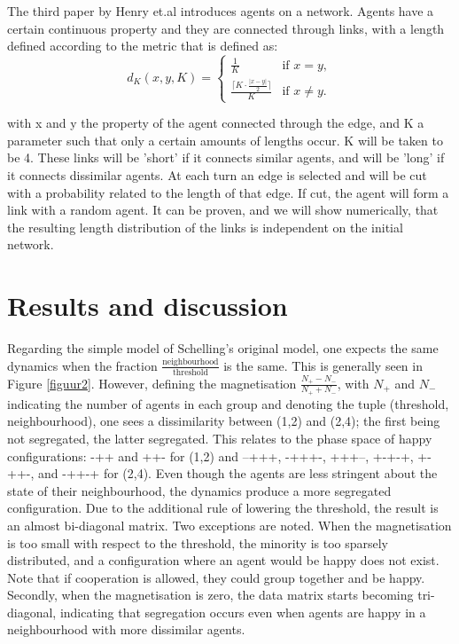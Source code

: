 The third paper by Henry et.al \cite{adam} introduces agents on a network. Agents have a certain continuous property and they are connected through links, with a length defined according to the metric that is defined as:
\[
d_K(x, y, K) = \begin{cases}
\frac{1}{K} & \text{if } x = y, \\
\frac{\lceil K \cdot \frac{|x - y|}{2} \rceil}{K} & \text{if } x \neq y.
\end{cases}
\]

with x and y the property of the agent connected through the edge, and K a parameter such that only a certain amounts of lengths occur. K will be taken to be 4.
These links will be 'short' if it connects similar agents, and will be 'long' if it connects dissimilar agents. At each turn an edge is selected and will be cut with a probability related to the length of that edge. If cut, the agent will form a link with a random agent. It can be proven, and we will show numerically, that the resulting length distribution of the links is independent on the initial network. 
 


\section{Results and discussion}
Regarding the simple model of Schelling's original model, one expects the same dynamics when the fraction $\frac{\text{neighbourhood}}{\text{threshold}}$ is the same. This is generally seen in Figure \ref{figuur2}. However, defining the magnetisation $\frac{N_+ - N_-}{N_+ + N_-}$, with $N_+$ and $N_-$ indicating the number of agents in each group and denoting the tuple (threshold, neighbourhood), one sees a dissimilarity between (1,2) and (2,4); the first being not segregated, the latter segregated. This relates to the phase space of happy configurations: -++ and ++- for (1,2) and --+++, -+++-, +++--, +-+-+, +-++-, and -++-+ for (2,4). Even though the agents are less stringent about the state of their neighbourhood, the dynamics produce a more segregated configuration.
Due to the additional rule of lowering the threshold, the result is an almost bi-diagonal matrix. Two exceptions are noted. When the magnetisation is too small with respect to the threshold, the minority is too sparsely distributed, and a configuration where an agent would be happy does not exist. Note that if cooperation is allowed, they could group together and be happy. Secondly, when the magnetisation is zero, the data matrix starts becoming tri-diagonal, indicating that segregation occurs even when agents are happy in a neighbourhood with more dissimilar agents.

